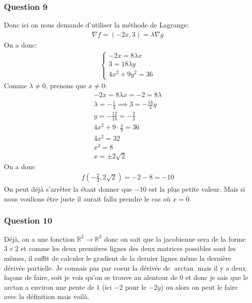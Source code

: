 \documentclass[a4paper]{article}
\begin{document}
\subsubsection{Question 9}

Donc ici on nous demande d'utiliser la méthode de Lagrange:
\begin{align*} 
    \nabla f = \left(-2x, 3\right) = \lambda \nabla g
\end{align*}
On a donc:
\begin{align*} 
    \begin{cases}
        -2x =  8\lambda x\\
        3 =  18 \lambda y\\
        4x^2 + 9y^2 = 36
    \end{cases}
\end{align*}
Comme $\lambda \neq 0$, prenons que $x \neq 0$:
\begin{align*} 
    -2x =  8 \lambda x = -2 = 8 \lambda\\
    \lambda = -\frac{1}{4} \implies 3 = -\frac{18}{4} y\\
    y = -\frac{12}{18} = -\frac{2}{3}\\
    4x^2 + 9 \cdot  \frac{4}{9} = 36\\
    4x^2 = 32\\
    x^2 = 8\\
    x =  \pm 2\sqrt{2}
\end{align*}
On a donc
\begin{align*} 
    f\left(-\frac{2}{3}, 2\sqrt{2}\right) = -2 - 8 = -10
\end{align*}
On peut déjà s'arrêter la étant donner que $-10$ est la plus petite valeur. Mais si nous voulions être juste il aurait fallu prendre le cas où $x = 0$.


\subsubsection{Question 10}

Déjà, on a une fonction $\mathbb{R}^2 \to \mathbb{R}^{3}$ donc on sait que la jacobienne sera de la forme $3 \times 2$ et comme les deux premières lignes des deux matrices possibles sont les mêmes, il suffit de calculer le gradient de la dernier lignes même la dernière dérivée partielle. Je connais pas par coeur la dérivée de $\arctan$ mais il y a deux façons de faire, soit je vois qu'on se trouve au alentour de $0$ et donc je sais que le arctan a environ une pente de $1$ (ici $-2$ pour le $-2y$) ou alors on peut le faire avec la définition mais voilà. 
\end{document}
